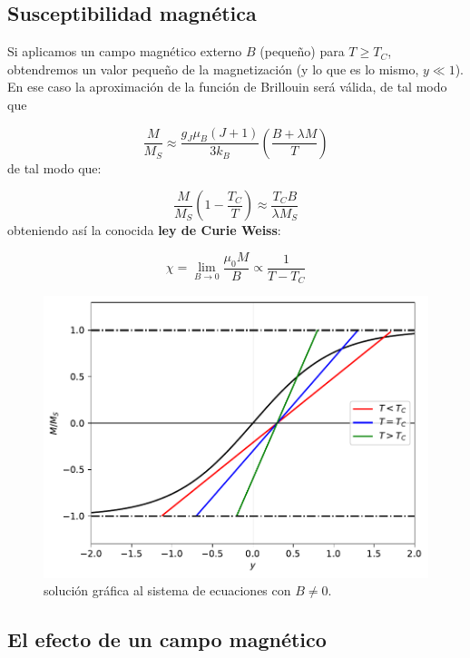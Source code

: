 \documentclass[12pt,a4paper]{book}
\numberwithin{equation}{section}
\numberwithin{figure}{section}
\newcommand{\parentesis}[1]{\left( #1  \right)}
\begin{document}
\subsection{Susceptibilidad magnética}

Si aplicamos un campo magnético externo $B$ (pequeño) para $T\geq T_C$, obtendremos un valor pequeño de la magnetización (y lo que es lo mismo, $y\ll 1$). En ese caso la aproximación de la función de Brillouin será válida, de tal modo que

\begin{equation}
    \frac{M}{M_S} \approx \frac{g_J \mu_B (J+1)}{3k_B} \parentesis{\frac{B+\lambda M}{T}} 
\end{equation}
de tal modo que:

\begin{equation}
    \frac{M}{M_S} \parentesis{1-\frac{T_C}{T}} \approx \frac{T_C B}{\lambda M_S}
\end{equation}
obteniendo así la conocida \textbf{ley de Curie Weiss}:

\begin{equation}
    \chi = \lim_{B \rightarrow 0} \frac{\mu_0 M}{B} \varpropto \frac{1}{T-T_C}
\end{equation}

\begin{figure}[h!]
    \centering
    \includegraphics[scale=1]{05-TC-B.pdf}
    \caption{solución gráfica al sistema de ecuaciones con $B\neq 0$.}
    \label{Fig:05-01-03}
\end{figure}




\subsection{El efecto de un campo magnético}
\end{document}
